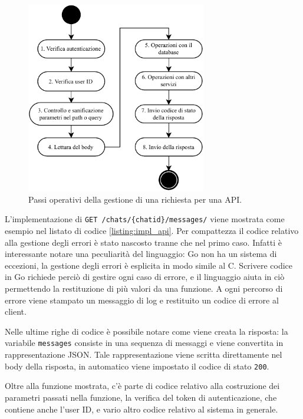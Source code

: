\begin{figure}[ht!]
\centering
\includegraphics[width=0.7\textwidth]{assets/04/operazioni-api.pdf}
\caption{Passi operativi della gestione di una richiesta per una API.}
\label{fig:operazioni-api}
\end{figure}

L'implementazione di \texttt{GET /chats/\{chatid\}/messages/} viene mostrata come esempio nel listato di codice \ref{listing:impl_api}. Per compattezza il codice relativo alla gestione degli errori è stato nascosto tranne che nel primo caso. Infatti è interessante notare una peculiarità del linguaggio: Go non ha un sistema di eccezioni, la gestione degli errori è esplicita in modo simile al C. Scrivere codice in Go richiede perciò di gestire ogni caso di errore, e il linguaggio aiuta in ciò permettendo la restituzione di più valori da una funzione. A ogni percorso di errore viene stampato un messaggio di log e restituito un codice di errore al client.

Nelle ultime righe di codice è possibile notare come viene creata la risposta: la variabile \texttt{messages} consiste in una sequenza di messaggi e viene convertita in rappresentazione JSON. Tale rappresentazione viene scritta direttamente nel body della risposta, in automatico viene impostato il codice di stato \texttt{200}.

Oltre alla funzione mostrata, c'è parte di codice relativo alla costruzione dei parametri passati nella funzione, la verifica del token di autenticazione, che contiene anche l'user ID, e vario altro codice relativo al sistema in generale.

